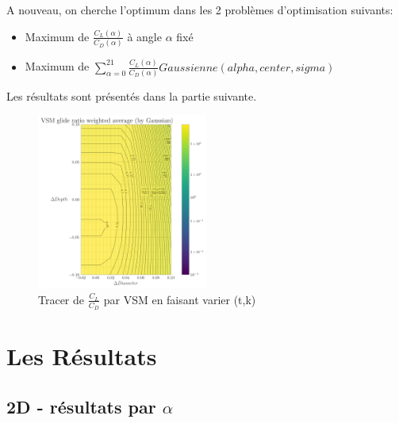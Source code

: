 \documentclass[conference]{IEEEtran}
\begin{document}
    A nouveau, on cherche l'optimum dans les 2 problèmes d'optimisation suivants:
    \begin{itemize}
        \item Maximum de $\frac{C_L(\alpha)}{C_D(\alpha)}$ à angle $\alpha$ fixé 
        \item Maximum de $\sum_{\alpha = 0}^{21}\frac{C_L(\alpha)}{C_D(\alpha)} Gaussienne(alpha, center, sigma) $
    \end{itemize}
    Les résultats sont présentés dans la partie suivante.

\begin{figure}[H]
    \centering
    \includegraphics[width=0.5\textwidth]{Pics/vsm.png}  
    \caption{Tracer de $\frac{C_L}{C_D}$ par VSM en faisant varier (t,k)}
    \label{fig:vsm}
\end{figure}


\IEEEpeerreviewmaketitle
\section{Les Résultats}

\subsection{2D - résultats par $\alpha$}
\end{document}
